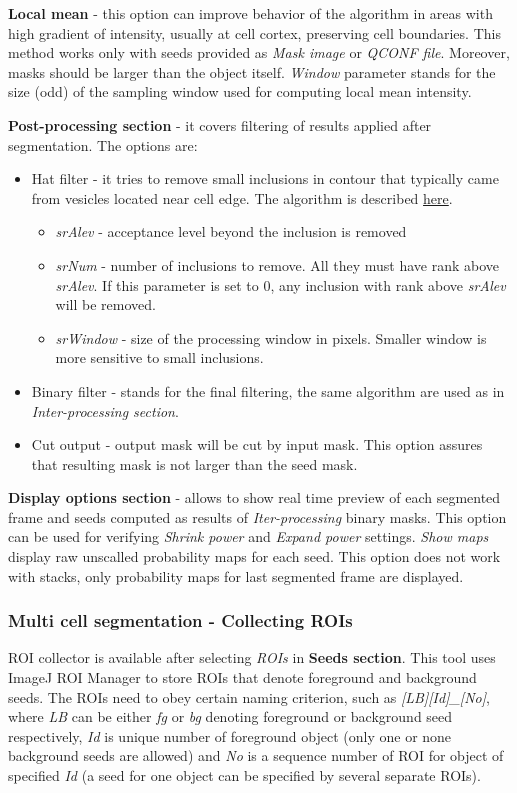 \documentclass[a4paper,12pt]{article}
\begin{document}
\textbf{Local mean} - this option can improve behavior of the algorithm in areas with high gradient of intensity, usually at cell cortex, preserving cell boundaries. This method works only with seeds provided as \textit{Mask image} or \textit{QCONF file}. Moreover, masks should be larger than the object itself. \textit{Window} parameter stands for the size (odd) of the sampling window used for computing local mean intensity.   

\textbf{Post-processing section} - it covers filtering of results applied after segmentation. The options are:
\begin{itemize}
	\item Hat filter - it tries to remove small inclusions in contour that typically came from vesicles located near cell edge. The algorithm is described \href{http://pilip.lnx.warwick.ac.uk/site/apidocs/index.html}{here}.
	\begin{itemize}
		\item \textit{srAlev} - acceptance level beyond the inclusion is removed
		\item \textit{srNum} - number of inclusions to remove. All they must have rank above \textit{srAlev}. If this parameter is set to 0, any inclusion with rank above \textit{srAlev} will be removed. 
		\item \textit{srWindow} - size of the processing window in pixels. Smaller window is more sensitive to small inclusions. 
	\end{itemize} 
	\item Binary filter - stands for the final filtering, the same algorithm are used as in \textit{Inter-processing section}.
	\item Cut output - output mask will be cut by input mask. This option assures that resulting mask is not larger than the seed mask.
\end{itemize}

\textbf{Display options section} - allows to show real time preview of each segmented frame and seeds computed as results of \textit{Iter-processing} binary masks. This option can be used for verifying \textit{Shrink power} and \textit{Expand power} settings. \textit{Show maps} display raw unscalled probability maps for each seed. This option does not work with stacks, only probability maps for last segmented frame are displayed.  

\subsubsection{Multi cell segmentation - Collecting ROIs}
\label{sec:CollectingROIs}
ROI collector is available after selecting \textit{ROIs} in \textbf{Seeds section}. This tool uses ImageJ ROI Manager to store ROIs that denote foreground and background seeds. The ROIs need to obey certain naming criterion, such as \textit{[LB][Id]\_[No]}, where \textit{LB} can be either \textit{fg} or \textit{bg} denoting foreground or background seed respectively, \textit{Id} is unique number of foreground object (only one or none background seeds are allowed) and \textit{No} is a sequence number of ROI for object of specified \textit{Id} (a seed for one object can be specified by several separate ROIs). 
\end{document}
